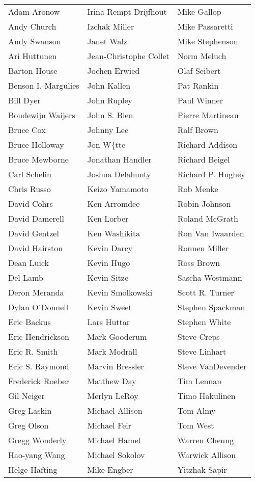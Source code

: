 \begin{center}
\begin{tabular}{lll}
Adam Aronow & Irina Rempt-Drijfhout & Mike Gallop\\
Andy Church & Izchak Miller & Mike Passaretti\\
Andy Swanson & Janet Walz & Mike Stephenson\\
Ari Huttunen & Jean-Christophe Collet & Norm Meluch\\
Barton House & Jochen Erwied & Olaf Seibert\\
Benson I. Margulies & John Kallen & Pat Rankin\\
Bill Dyer & John Rupley & Paul Winner\\
Boudewijn Waijers & John S. Bien & Pierre Martineau\\
Bruce Cox & Johnny Lee & Ralf Brown\\
Bruce Holloway & Jon W\{tte & Richard Addison\\
Bruce Mewborne & Jonathan Handler & Richard Beigel\\
Carl Schelin & Joshua Delahunty & Richard P. Hughey\\
Chris Russo & Keizo Yamamoto & Rob Menke\\
David Cohrs & Ken Arromdee & Robin Johnson\\
David Damerell & Ken Lorber & Roland McGrath\\
David Gentzel & Ken Washikita & Ron Van Iwaarden\\
David Hairston & Kevin Darcy & Ronnen Miller\\
Dean Luick & Kevin Hugo & Ross Brown\\
Del Lamb & Kevin Sitze & Sascha Wostmann\\
Deron Meranda & Kevin Smolkowski & Scott R. Turner\\
Dylan O'Donnell & Kevin Sweet & Stephen Spackman\\
Eric Backus & Lars Huttar & Stephen White\\
Eric Hendrickson & Mark Gooderum & Steve Creps\\
Eric R. Smith & Mark Modrall & Steve Linhart\\
Eric S. Raymond & Marvin Bressler & Steve VanDevender\\
Frederick Roeber & Matthew Day & Tim Lennan\\
Gil Neiger & Merlyn LeRoy & Timo Hakulinen\\
Greg Laskin & Michael Allison & Tom Almy\\
Greg Olson & Michael Feir & Tom West\\
Gregg Wonderly & Michael Hamel & Warren Cheung\\
Hao-yang Wang & Michael Sokolov & Warwick Allison\\
Helge Hafting & Mike Engber & Yitzhak Sapir
\end{tabular}
\end{center}

